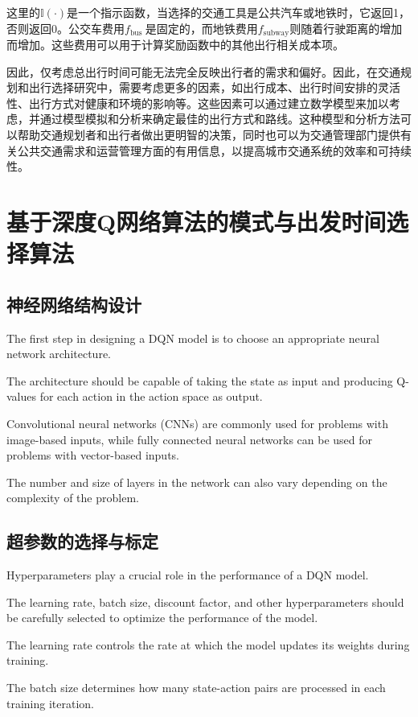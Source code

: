 这里的$\mathbb{I}(\cdot)$是一个指示函数，当选择的交通工具是公共汽车或地铁时，它返回1，否则返回0。公交车费用$f_{\text {bus }}$是固定的，而地铁费用$f_{\text {subway} }$则随着行驶距离的增加而增加。这些费用可以用于计算奖励函数中的其他出行相关成本项。

因此，仅考虑总出行时间可能无法完全反映出行者的需求和偏好。因此，在交通规划和出行选择研究中，需要考虑更多的因素，如出行成本、出行时间安排的灵活性、出行方式对健康和环境的影响等。这些因素可以通过建立数学模型来加以考虑，并通过模型模拟和分析来确定最佳的出行方式和路线。这种模型和分析方法可以帮助交通规划者和出行者做出更明智的决策，同时也可以为交通管理部门提供有关公共交通需求和运营管理方面的有用信息，以提高城市交通系统的效率和可持续性。

\section{基于深度Q网络算法的模式与出发时间选择算法}

\subsection{神经网络结构设计}

The first step in designing a DQN model is to choose an appropriate neural network architecture.

The architecture should be capable of taking the state as input and producing Q-values for each action in the action space as output.

Convolutional neural networks (CNNs) are commonly used for problems with image-based inputs, while fully connected neural networks can be used for problems with vector-based inputs.

The number and size of layers in the network can also vary depending on the complexity of the problem.

\subsection{超参数的选择与标定}

Hyperparameters play a crucial role in the performance of a DQN model.

The learning rate, batch size, discount factor, and other hyperparameters should be carefully selected to optimize the performance of the model.

The learning rate controls the rate at which the model updates its weights during training.

The batch size determines how many state-action pairs are processed in each training iteration.

